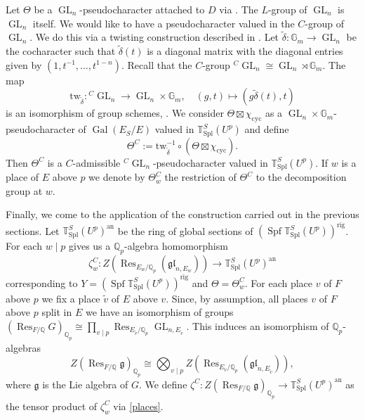\documentclass{amsart}
\theoremstyle{definition}
\theoremstyle{remark}
\DeclareMathOperator{\Res}{Res}
\DeclareMathOperator{\GL}{GL}
\DeclareMathOperator{\Gal}{Gal}
\newcommand{\Qp}{\mathbb {Q}_p}
\newcommand{\QQ}{\mathbb Q}
\newcommand{\ana}{\mathrm{an}}
\newcommand{\Gm}{\mathbb G_m}
\DeclareMathOperator{\Spf}{Spf}
\newcommand{\rig}{\mathrm{rig}}
\newcommand{\tw}{\mathrm{tw}}
\newcommand{\cyc}{\mathrm{cyc}}
\newcommand{\gl}{\mathfrak{gl}}
\begin{document}
Let $\Theta$ be a $\GL_n$-pseudocharacter attached to $D$ via \cite{emerson2023comparison}. The $L$-group of $\GL_n$ is $\GL_n$ itself.
We would like to have a pseudocharacter valued in the $C$-group of $\GL_n$. 
We do this via a twisting construction described in \cite[Section 4.7]{DPS}. 
Let $\tilde{\delta}: \Gm \rightarrow \GL_n$ be the cocharacter such that  $\tilde{\delta}(t)$
is a diagonal matrix with the diagonal entries given by $(1, t^{-1}, \ldots, t^{1-n})$. Recall that the $C$-group ${}^C\GL_n\cong \GL_n \rtimes \Gm$. The map 
\begin{equation}\label{twisting}
\tw_{\tilde{\delta}}: {}^C\GL_n \rightarrow \GL_n \times \Gm, \quad (g,t)\mapsto (g \tilde{\delta}(t), t)
\end{equation}
is an isomorphism of group schemes, \cite[Example 2 (3)]{zhu}. We consider $\Theta \boxtimes \chi_{\cyc}$ as
a $\GL_n \times \Gm$-pseudocharacter of $\Gal(E_S/E)$ valued in $\mathbb T^S_{\mathrm{Spl}}(U^p)$ and define $$\Theta^C:= \tw_{\tilde{\delta}}^{-1}\circ (\Theta\boxtimes \chi_\cyc).$$
Then $\Theta^C$ is a $C$-admissible ${}^C\GL_n$-pseudocharacter valued in $\mathbb T^S_{\mathrm{Spl}}(U^p)$. If $w$ is a place of $E$ above $p$ we denote by $\Theta^C_w$ the restriction of $\Theta^C$ to the decomposition group at $w$. 

Finally, we come to the application of the construction carried out in the previous sections. Let $\mathbb T^S_{\mathrm{Spl}}(U^p)^{\ana}$ be the ring of global sections
of $(\Spf \mathbb T^S_{\mathrm{Spl}}(U^p))^{\rig}$. For each $w\mid p$  gives us 
a $\Qp$-algebra homomorphism 
\begin{equation}\label{zetaCw}
\zeta^C_{w}: Z(\Res_{E_w/\Qp} (\gl_{n, E_w}))\rightarrow \mathbb T^S_{\mathrm{Spl}}(U^p)^{\ana}
\end{equation}
corresponding to $Y=(\Spf \mathbb T^S_{\mathrm{Spl}}(U^p))^{\rig}$ and $\Theta=\Theta^C_w$.
For each place $v$ of $F$ above $p$ we fix a place $\tilde{v}$ of $E$ above $v$. 
Since, by assumption, all places 
$v$ of $F$ above $p$ split in $E$ we have an isomorphism
of groups $(\Res_{F/\QQ} G)_{\Qp} \cong \prod_{v\mid p}
\Res_{E_{\tilde{v}}/\Qp} \GL_{n, E_{\tilde{v}}}$. This induces an isomorphism of $\Qp$-algebras
\begin{equation}\label{places}
Z(\Res_{F/\QQ} \mathfrak g)_{\Qp} \cong \bigotimes_{v\mid p} Z(\Res_{E_{\tilde{v}}/\Qp} (\gl_{n, E_{\tilde{v}}})),
\end{equation}
where $\mathfrak g$ is the Lie algebra of $G$. We define
$\zeta^C: Z(\Res_{F/\QQ} \mathfrak g)_{\Qp} \rightarrow 
\mathbb T^S_{\mathrm{Spl}}(U^p)^{\ana}$ as the tensor product of $\zeta^C_w$ via \eqref{places}.
\end{document}
